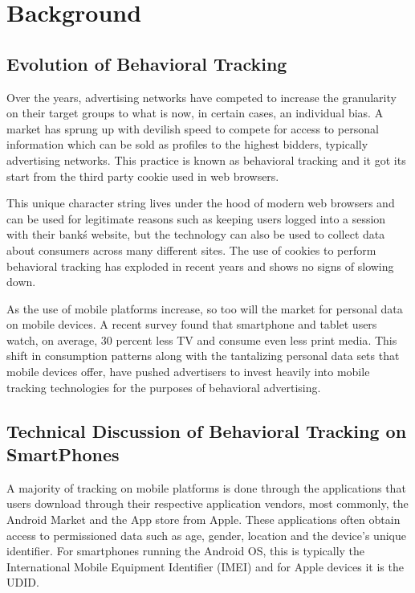 \section{Background}

	\subsection{Evolution of Behavioral Tracking}

Over the years, advertising networks have competed to increase the granularity on their target groups to what is now, in certain cases, an individual bias. A market has sprung up with devilish speed to compete for access to personal information which can be sold as profiles to the highest bidders, typically advertising networks\cite{tracking}. This practice is known as behavioral tracking and it got its start from the third party cookie used in web browsers.

This unique character string lives under the hood of modern web browsers and can be used for legitimate reasons such as keeping users logged into a session with their bank\'s website, but the technology can also be used to collect data about consumers across many different sites.  The use of cookies to perform behavioral tracking has exploded in recent years and shows no signs of slowing down\cite{Cens2012}. 

As the use of mobile platforms increase, so too will the market for personal data on mobile devices. A recent survey found that smartphone and tablet users watch, on average, 30 percent less TV and consume even less print media\cite{Abi2012}. This shift in consumption patterns along with the tantalizing personal data sets that mobile devices offer, have pushed advertisers to invest heavily into mobile tracking technologies for the purposes of behavioral advertising\cite{meeker}.
   

	\subsection{Technical Discussion of Behavioral Tracking on SmartPhones}

A majority of tracking on mobile platforms is done through the applications that users download through their respective application vendors, most commonly, the Android Market and the App store from Apple. These applications often obtain access to permissioned data such as age, gender, location and the device’s unique identifier. For smartphones running the Android OS, this is typically the International Mobile Equipment Identifier (IMEI) and for Apple devices it is the UDID.

